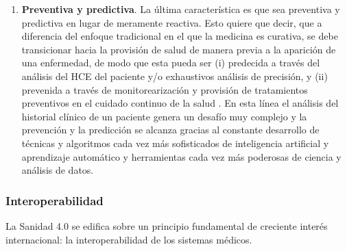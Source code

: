 \begin{enumerate}

\item \textbf{Preventiva y predictiva}. La última característica es que sea preventiva y predictiva en lugar de meramente reactiva. Esto quiere que decir, que a diferencia del enfoque tradicional en el que la medicina es curativa, se debe transicionar hacia la provisión de salud de manera previa a la aparición de una enfermedad, de modo que esta pueda ser (i) predecida a través del análisis del HCE del paciente y/o exhaustivos análisis de precisión, y (ii) prevenida a través de monitorearización y provisión de tratamientos preventivos en el cuidado continuo de la salud \cite{ruiz2023inteligencia}. En esta línea el análisis del historial clínico de un paciente genera un desafío muy complejo y la prevención y la predicción se alcanza gracias al constante desarrollo de técnicas y algoritmos cada vez más sofisticados de inteligencia artificial y aprendizaje automático y herramientas cada vez más poderosas de ciencia y análisis de datos.
\end{enumerate}

\subsubsection{Interoperabilidad}

La Sanidad 4.0 se edifica sobre un principio fundamental de creciente interés internacional: la interoperabilidad de los sistemas médicos.


